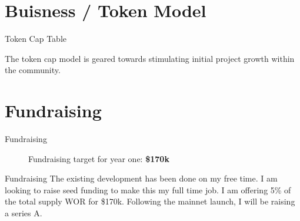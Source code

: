 \documentclass[final, xcolor=pdftex, dvipsnames, table, aspectratio=169, 14pt]{beamer}
\renewcommand{\sum}{170}
\begin{document}
\section{Buisness / Token Model}
\begin{frame}{Token Cap Table}


\begin{figure}[H]
\begin{center}
\end{center}
\end{figure}
The token cap model is geared towards stimulating initial project growth within the community.
\end{frame}

\section{Fundraising}
\begin{frame}{Fundraising}

\begin{figure}[H]
Fundraising target for year one: \textbf{\$\sum k}
\begin{center}
\label{funding}
\end{center}
\end{figure}

\end{frame}
\begin{frame}{Fundraising}
The existing development has been done on my free time. I am looking to raise seed funding to make this my full time job. I am offering 5\% of the total supply WOR for \$\sum k. Following the mainnet launch, I will be raising a series A.
\end{frame}
\end{document}
